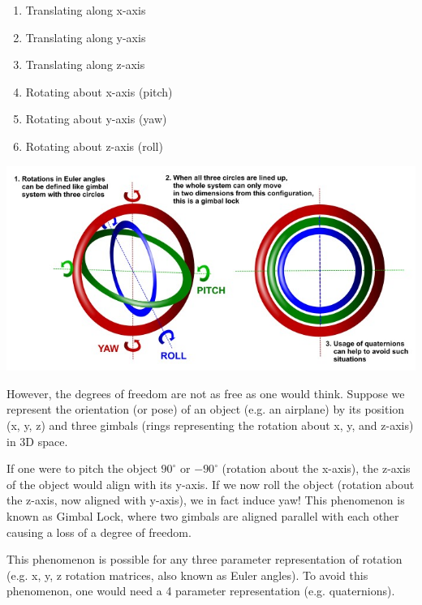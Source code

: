 \documentclass[12pt,letterpaper]{article}
\begin{document}
\begin{enumerate}
    \item Translating along x-axis
    \item Translating along y-axis
    \item Translating along z-axis
    \item Rotating about x-axis (pitch)
    \item Rotating about y-axis (yaw)
    \item Rotating about z-axis (roll)
\end{enumerate}

\includegraphics[scale=0.5]{gimballock}

However, the degrees of freedom are not as free as one would think. Suppose we represent the orientation (or pose) of an object (e.g. an airplane) by its position (x, y, z) and three gimbals (rings representing the rotation about x, y, and z-axis) in 3D space.

If one were to pitch the object $90^\circ$ or $-90^\circ$ (rotation about the x-axis), the z-axis of the object would align with its y-axis. If we now roll the object (rotation about the z-axis, now aligned with y-axis), we in fact induce yaw! This phenomenon is known as Gimbal Lock, where two gimbals are aligned parallel with each other causing a loss of a degree of freedom.

This phenomenon is possible for any three parameter representation of rotation (e.g. x, y, z rotation matrices, also known as Euler angles). To avoid this phenomenon, one would need a 4 parameter representation (e.g. quaternions).
\end{document}
